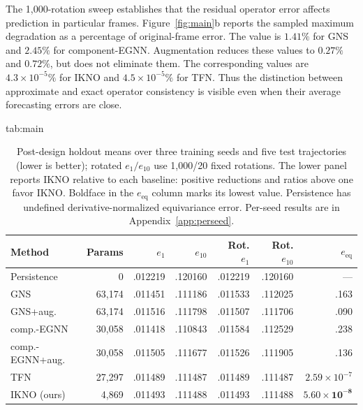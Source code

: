 \documentclass[mlmain]{jmlr}
\newcommand{\IKNO}{\textsc{IKNO}}
\begin{document}
The 1,000-rotation sweep establishes that the residual operator error affects
prediction in particular frames. Figure~\ref{fig:main}b reports the sampled
maximum degradation as a percentage of original-frame error. The value is
$1.41\%$ for GNS and $2.45\%$ for component-EGNN. Augmentation reduces these
values to $0.27\%$ and $0.72\%$, but does not eliminate them. The corresponding
values are $4.3\times10^{-5}\%$ for \IKNO{} and $4.5\times10^{-5}\%$ for TFN.
Thus the distinction between approximate and exact operator consistency is
visible even when their average forecasting errors are close.

\begin{table}[t]
\floatconts
{tab:main}
{\caption{Post-design holdout means over three training seeds and five test
trajectories (lower is better); rotated $e_1/e_{10}$ use 1,000/20 fixed
rotations. The lower panel reports \IKNO{} relative to each baseline: positive
reductions and ratios above one favor \IKNO{}. Boldface in the
$e_{\mathrm{eq}}$ column marks its lowest value. Persistence has undefined
derivative-normalized equivariance error. Per-seed results are in
Appendix~\ref{app:perseed}.}}
{\scriptsize\setlength{\tabcolsep}{5.8pt}\begin{tabular}{lrrrrrr}
\toprule
Method & Params & $e_1$ & $e_{10}$ & Rot. $e_1$ & Rot. $e_{10}$ & $e_{\mathrm{eq}}$\\
\midrule
Persistence & 0 & .012219 & .120160 & .012219 & .120160 & ---\\
GNS & 63,174 & .011451 & .111186 & .011533 & .112025 & .163\\
GNS+aug. & 63,174 & .011516 & .111798 & .011507 & .111706 & .090\\
comp.-EGNN & 30,058 & .011418 & .110843 & .011584 & .112529 & .238\\
comp.-EGNN+aug. & 30,058 & .011505 & .111677 & .011526 & .111905 & .136\\
TFN & 27,297 & .011489 & .111487 & .011489 & .111487 & $2.59\!\times\!10^{-7}$\\
\IKNO{} (ours) & 4,869 & .011493 & .111488 & .011493 & .111488 & $\mathbf{5.60\!\times\!10^{-8}}$\\
\bottomrule
\end{tabular}

}
\end{table}
\end{document}
